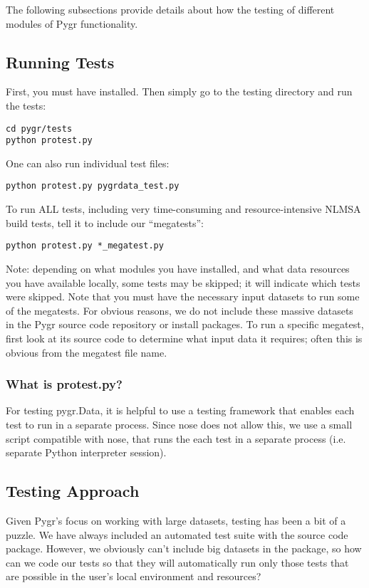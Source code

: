 \documentclass{howto}
\begin{document}
The following subsections provide details about how the testing of different
modules of Pygr functionality. 

\subsection{Running Tests}
First, you must have  installed.  Then simply go to 
the testing directory and run the tests:
\begin{verbatim}
cd pygr/tests
python protest.py
\end{verbatim}
One can also run individual test files:
\begin{verbatim}
python protest.py pygrdata_test.py
\end{verbatim}

To run ALL tests, including very time-consuming and resource-intensive
NLMSA build tests, tell it to include our ``megatests'':
\begin{verbatim}
python protest.py *_megatest.py
\end{verbatim}
Note: depending on what modules you have installed, and what data resources
you have available locally, some tests may be skipped; it will indicate
which tests were skipped.  Note that you must have the necessary input 
datasets to run some of the megatests.  For obvious reasons, we do not include
these massive datasets in the Pygr source code repository or install packages.
To run a specific megatest, first look at its source code to determine what
input data it requires; often this is obvious from the megatest file name.

\subsubsection{What is protest.py?}
For testing pygr.Data, it is helpful to use a testing framework
that enables each test to run in a separate process.  Since nose does
not allow this, we use a small script compatible with nose, that
runs the each test in a separate process (i.e. separate Python interpreter
session).

\subsection{Testing Approach}
\label{test-utils}
Given Pygr's focus on working with large datasets, testing has been a bit of a puzzle.  
We have always included an automated test suite with the source code package.  
However, we obviously can't include big datasets in the package, so how can 
we code our tests so that they will automatically run only those tests that 
are possible in the user's local environment and resources?  
\end{document}
